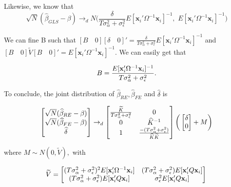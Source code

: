 \documentclass[11pt]{article}
\begin{document}
Likewise, we know that
\[
\sqrt{N} (\widehat{\beta}_{GLS}-\beta) \rightarrow_{d} N\big( \frac{\delta}{T\sigma_\alpha^2 + \sigma_\epsilon^2}  E[\mathbf{x}_i' \Omega^{-1} \mathbf{x}_i]^{-1},\,\, E[\mathbf{x}_i' \Omega^{-1} \mathbf{x}_i]^{-1}\big)
\]

We can fine B such that $[B\quad 0][\delta\quad 0]' = \frac{\delta}{T \sigma_\alpha^2 + \sigma_\epsilon^2} E[\mathbf{x}_i' \Omega^{-1} \mathbf{x}_i]^{-1}$ and $[B\quad 0] \widetilde{V} [B\quad 0]' = E[\mathbf{x}_i' \Omega^{-1} \mathbf{x}_i]^{-1}$. We can easily get that 

\[
B = \frac{E[\mathbf{x}_i' \Omega^{-1} \mathbf{x}_i]^{-1}}{T\sigma_\alpha^2 + \sigma_\epsilon^2}.\\
\]

\vspace{0.2in}

To conclude, the joint distribution of $\widehat{\beta}_{RE}, \widehat{\beta}_{FE}$ and $\widehat{\delta}$ is

\[
 \begin{bmatrix}
\sqrt{N} (\widehat{\beta}_{RE} - \beta)\\
\sqrt{N} (\widehat{\beta}_{FE} - \beta)\\
\widehat{\delta}
\end{bmatrix} \rightarrow_d  \begin{bmatrix}
\frac{\widetilde{K}}{T\sigma_\alpha^2 + \sigma_\epsilon^2} & 0 \\
0 & \widehat{K}^{-1} \\
1 & \frac{-(T\sigma_\alpha^2 + \sigma_\epsilon^2)}{\widehat{K} \widetilde{K}}\\
\end{bmatrix} \bigg(\begin{bmatrix}
\delta\\
0
\end{bmatrix}   + M  \bigg)\\
\]


where  $M \sim N(0, \widetilde{V}),$ with

\[
\widetilde{V} =  \begin{bmatrix}
(T\sigma_\alpha^2 + \sigma_\epsilon^2)^2 E[\mathbf{x}_i' \Omega^{-1} \mathbf{x}_i] & (T\sigma_\alpha^2 + \sigma_\epsilon^2) E[\mathbf{x}_i' Q \mathbf{x}_i] \\
 (T\sigma_\alpha^2 + \sigma_\epsilon^2) E[\mathbf{x}_i' Q \mathbf{x}_i] & \sigma_\epsilon^2 E[\mathbf{x}_i' Q \mathbf{x}_i]
\end{bmatrix} \\
\]
\newpage
\end{document}
